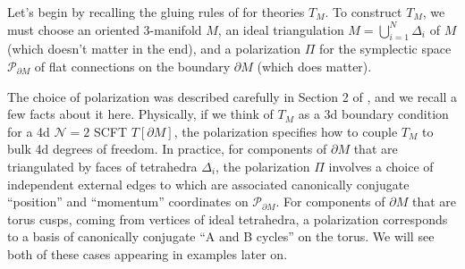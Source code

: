 \documentclass[11pt,letterpaper]{article}
\numberwithin{equation}{section}
\newcommand{\pd}{\partial}
\newcommand{\CN}{\mathcal{N}}
\newcommand{\CP}{\mathcal{P}}
\begin{document}
Let's begin by recalling the gluing rules of \cite{DGG} for theories $T_M$. To construct $T_M$, we must choose an oriented 3-manifold $M$, an ideal triangulation $M = \bigcup_{i=1}^N\Delta_i$ of $M$ (which doesn't matter in the end), and a polarization $\Pi$ for the symplectic space $\CP_{\pd M}$ of flat connections on the boundary $\pd M$ (which does matter).

The choice of polarization was described carefully in Section 2 of \cite{DGG}, and we recall a few facts about it here. Physically, if we think of $T_M$ as a 3d boundary condition for a  4d $\CN=2$ SCFT $T[\pd M]$, the polarization specifies how to couple $T_M$ to bulk 4d degrees of freedom. In practice, for components of $\pd M$ that are triangulated by faces of tetrahedra $\Delta_i$, the polarization $\Pi$ involves a choice of independent external edges to which are associated canonically conjugate ``position'' and ``momentum'' coordinates on $\CP_{\pd M}$. For components of $\pd M$ that are torus cusps, coming from vertices of ideal tetrahedra, a polarization corresponds to a basis of canonically conjugate ``A and B cycles'' on the torus. We will see both of these cases appearing in examples later on.
\end{document}
